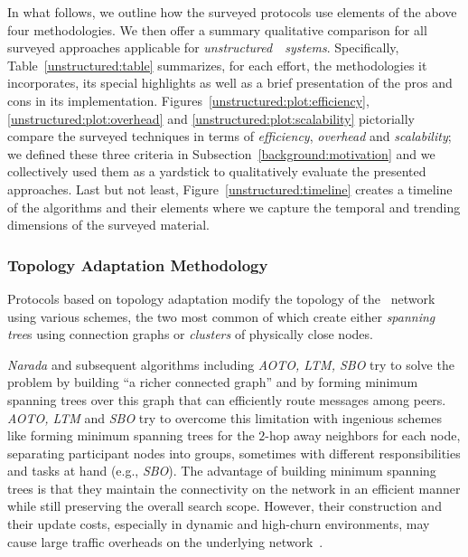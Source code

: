 In what follows, we outline how the surveyed protocols 
use elements of the above four methodologies. 
We then  offer a summary qualitative comparison for all surveyed
approaches applicable for \emph{unstructured}~\p~\emph{systems}.
Specifically, Table~\ref{unstructured:table} summarizes, for each
effort, the methodologies it incorporates, its special highlights as well as 
a brief presentation of the pros and cons in its implementation. 
Figures~\ref{unstructured:plot:efficiency}, \ref{unstructured:plot:overhead}
and \ref{unstructured:plot:scalability} pictorially compare the
surveyed techniques in terms of \emph{efficiency}, \emph{overhead} and \emph{scalability};
we defined these three criteria in Subsection~\ref{background:motivation}
and we collectively used them as a yardstick to qualitatively 
evaluate the presented approaches. Last but not least,
Figure~\ref{unstructured:timeline} creates a timeline of the algorithms
and their elements where we capture the temporal and trending dimensions
of the surveyed material.

\subsubsection{Topology Adaptation Methodology}

Protocols based on topology adaptation 
modify the topology of the \p\ network
using various schemes, the two most common of which
create either \emph{spanning tree}s using connection graphs
or \emph{clusters} of physically close nodes.

\emph{Narada} and subsequent algorithms including 
\emph{AOTO, LTM, SBO} try to solve the problem
by building ``a richer connected graph'' and by forming 
minimum spanning trees over
this graph that can efficiently route messages among peers. 
\emph{AOTO, LTM} and \emph{SBO} try to
overcome this limitation with ingenious schemes
like forming minimum spanning trees
for the $2$-hop away neighbors for each node, separating participant nodes into
groups, sometimes with different responsibilities and tasks at hand (e.g.,
\emph{SBO}). 
The advantage of building minimum spanning trees is that
they maintain the connectivity on the network in
an efficient manner while still preserving the overall search scope.
However, their construction and their update costs,
especially in dynamic and high-churn environments,
may cause large traffic overheads on the underlying
network~\cite{CRZ2000,CRSZ2001,CRSZ2002}.

